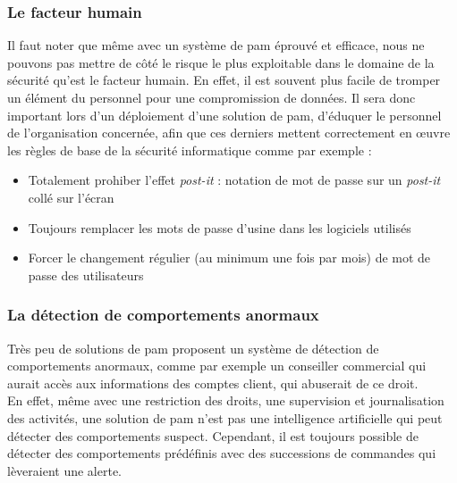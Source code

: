 \subsubsection{Le facteur humain} Il faut noter que même avec un système de \gls{pam} éprouvé et efficace, nous ne pouvons pas mettre de côté le risque le plus exploitable dans le domaine de la sécurité qu'est le facteur humain. En effet, il est souvent plus facile de tromper un élément du personnel pour une compromission de données. Il sera donc important lors d'un déploiement d'une solution de \gls{pam}, d'éduquer le personnel de l'organisation concernée, afin que ces derniers mettent correctement en œuvre les règles de base de la sécurité informatique comme par exemple :
\begin{itemize}
	\item Totalement prohiber \og l'effet \textit{post-it} \fg{} : notation de mot de passe sur un \textit{post-it} collé sur l'écran
	\item Toujours remplacer les mots de passe d'usine dans les logiciels utilisés
	\item Forcer le changement régulier (au minimum une fois par mois) de mot de passe des utilisateurs
\end{itemize}

\subsubsection{La détection de comportements anormaux}
Très peu de solutions de \gls{pam} proposent un système de détection de comportements anormaux, comme par exemple un conseiller commercial qui aurait accès aux informations des comptes client, qui abuserait de ce droit.\\
En effet, même avec une restriction des droits, une supervision et journalisation des activités, une solution de \gls{pam} n'est pas une intelligence artificielle qui peut détecter des comportements suspect. Cependant, il est toujours possible de détecter des comportements prédéfinis avec des successions de commandes qui lèveraient une alerte.

